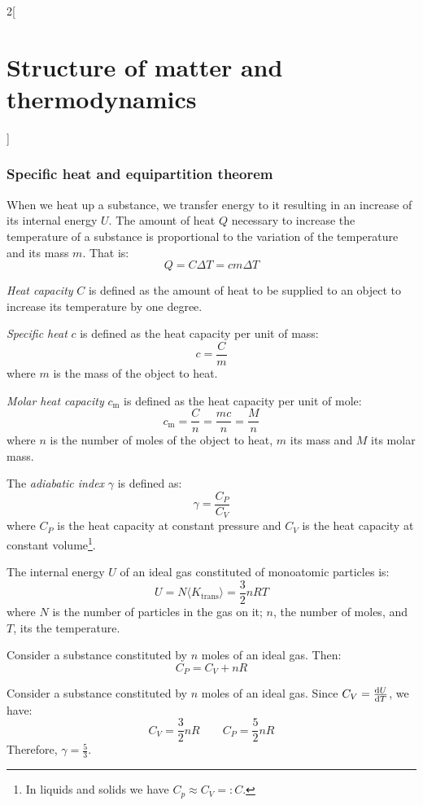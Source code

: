 \documentclass[../../../main_physics.tex]{subfiles}
\begin{document}
\begin{multicols}{2}[\section{Structure of matter and thermodynamics}]
  \subsubsection{Specific heat and equipartition theorem}
  \begin{definition}
    When we heat up a substance, we transfer energy to it resulting in an increase of its internal energy $U$. The amount of heat $Q$ necessary to increase the temperature of a substance is proportional to the variation of the temperature and its mass $m$. That is:
    $$Q=C\Delta T=cm\Delta T$$
  \end{definition}
  \begin{definition}
    \emph{Heat capacity} $C$ is defined as the amount of heat to be supplied to an object to increase its temperature by one degree.
  \end{definition}
  \begin{definition}
    \emph{Specific heat} $c$ is defined as the heat capacity per unit of mass: $$c=\frac{C}{m}$$ where $m$ is the mass of the object to heat.
  \end{definition}
  \begin{definition}
    \emph{Molar heat capacity} $c_\text{m}$ is defined as the heat capacity per unit of mole: $$c_\text{m}=\frac{C}{n}=\frac{mc}{n}=\frac{M}{n}$$ where $n$ is the number of moles of the object to heat, $m$ its mass and $M$ its molar mass.
  \end{definition}
  \begin{definition}
    The \emph{adiabatic index} $\gamma$ is defined as:
    $$\gamma=\frac{C_P}{C_V}$$
    where $C_P$ is the heat capacity at constant pressure and $C_V$ is the heat capacity at constant volume\footnote{In liquids and solids we have $C_p\approx C_V=:C$.}.
  \end{definition}
  \begin{definition}
    The internal energy $U$ of an ideal gas constituted of monoatomic particles is:
    $$U=N\langle K_\text{trans}\rangle=\frac{3}{2}nRT$$
    where $N$ is the number of particles in the gas on it; $n$, the number of moles, and $T$, its the temperature.
  \end{definition}
  \begin{proposition}
    Consider a substance constituted by $n$ moles of an ideal gas. Then:
    $$C_P=C_V+nR$$
  \end{proposition}
  \begin{proposition}
    Consider a substance constituted by $n$ moles of an ideal gas. Since $C_V=\dv{U}{T}$, we have: $$C_V=\frac{3}{2}nR\qquad C_P=\frac{5}{2}nR$$ Therefore, $\gamma=\frac{5}{3}$.

\end{proposition}
\end{multicols}
\end{document}
